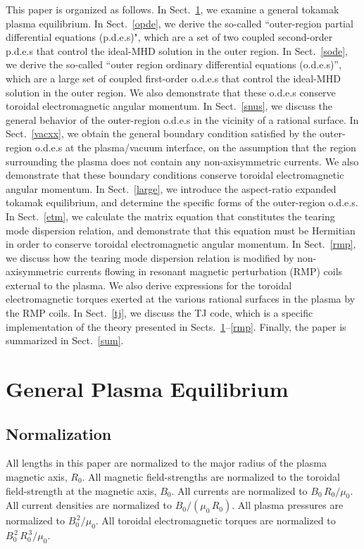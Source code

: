 \documentclass[12pt,prb,aps]{revtex4-1}
\begin{document}
This paper is organized as follows. In Sect.~\ref{geq}, we examine a general tokamak plasma equilibrium. In Sect.~\ref{opde}, we
derive the so-called ``outer-region  partial differential equations (p.d.e.s)", which are a set of two coupled second-order p.d.e.s that control   the ideal-MHD solution in the outer region. In
Sect.~\ref{sode}, we derive the so-called ``outer region ordinary differential equations  (o.d.e.s)'', which are a large set of coupled first-order 
o.d.e.s that control the ideal-MHD solution in the outer region. We also demonstrate that these o.d.e.s conserve toroidal electromagnetic
angular momentum. In Sect.~\ref{snus}, we discuss the general behavior of the outer-region o.d.e.s in the vicinity of a rational surface. 
In Sect.~\ref{vacxx}, we obtain the general boundary condition satisfied by the outer-region o.d.e.s at the plasma/vacuum interface, on the assumption that
the region surrounding the plasma does not contain any non-axisymmetric currents. We also demonstrate that these boundary conditions conserve
toroidal electromagnetic angular momentum. In Sect.~\ref{large}, we introduce the aspect-ratio expanded tokamak equilibrium, and determine the
specific forms of the outer-region o.d.e.s. In Sect.~\ref{etm}, we calculate the matrix equation that constitutes the tearing mode dispersion relation, and
demonstrate that this equation must be Hermitian in order to conserve toroidal electromagnetic angular momentum. In Sect.~\ref{rmp}, 
we discuss how the tearing mode dispersion relation is modified by non-axisymmetric currents flowing in
 resonant magnetic perturbation (RMP) coils external to the plasma. We also derive expressions for the toroidal electromagnetic
torques exerted at the various rational surfaces in the plasma by the RMP coils. In Sect.~\ref{tj}, we discuss the
TJ code, which is a specific implementation of the theory presented in Sects.~\ref{geq}--\ref{rmp}. Finally, the paper is summarized in Sect.~\ref{sum}.

\section{General Plasma Equilibrium}\label{geq}
\subsection{Normalization}\label{coords}
All lengths in this paper are normalized to  the major radius of the plasma magnetic axis, $R_0$. All magnetic field-strengths
are normalized to the  toroidal field-strength at the magnetic axis, $B_0$. All currents are normalized to $B_0\,R_0/\mu_0$. All current densities are normalized to $B_0/(\mu_0\,R_0)$.  All plasma pressures are normalized to $B_0^{\,2}/\mu_0$.
All toroidal electromagnetic torques are normalized to $B_0^{\,2}\,R_0^{\,3}/\mu_0$. 
\end{document}

